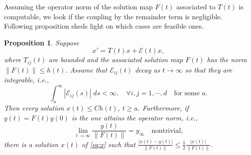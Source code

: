 \documentclass[a4paper,11pt]{article}
\newtheorem{proposition}{Proposition}[section]
\theoremstyle{remark}
\begin{document}
Assuming the operator norm of the solution map $F(t)$ associated to $T(t)$ is computable, we look if the coupling by the remainder term is negligible. Following proposition sheds light on which cases are feasible ones.
\begin{proposition}
 Suppose 
 \begin{equation}
x' = T(t)x + \mathcal{E}(t)x, \label{eq:x}  
 \end{equation}
where $T_{ij}(t)$ are bounded and the associated solution map $F(t)$ has the norm $\|F(t)\| \le h(t)$. Assume that $\mathcal{E}_{ij}(t)$ decay as $t \rightarrow \infty$ so that they are integrable, i.e.,
 $$ \int_a^\infty |\mathcal{E}_{ij}(s)| \; ds < \infty, \quad \forall i,j=1,\cdots,d \quad \text{for some $a$.}$$
 Then every solution $x(t) \le Ch(t)$, $t\ge a$. Furthermore, if $y(t)=F(t)y(0)$ is the one attains the operator norm, i.e.,
 $$ \lim_{t \rightarrow \infty}\frac{y(t)}{\|F(t)\|} = y_\infty \quad \text{nontrivial,}$$
 there is a solution $x(t)$ of \eqref{eq:x} such that $\displaystyle \frac{|x(t)-y(t)|}{\|F(t)\|} \le \frac{1}{2}\frac{|x(t)|}{\|F(t)\|}.$
\end{proposition}
\end{document}
